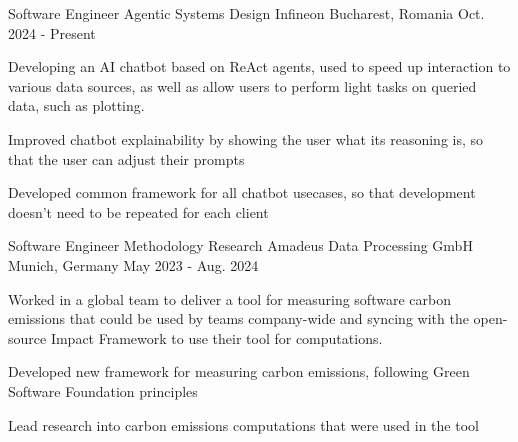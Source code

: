 

\begin{cventries}

  \cventry
    {Software Engineer \quad\textbar\quad Agentic Systems Design} %
    {Infineon} %
    {Bucharest, Romania} %
    {Oct. 2024 - Present} %
    {
      \begin{cvitems} %
        \item {Developing an AI chatbot based on ReAct agents, used to speed up interaction to various data sources, as well as allow users to perform light tasks on queried data, such as plotting.}
        \item {Improved chatbot explainability by showing the user what its reasoning is, so that the user can adjust their prompts}
        \item {Developed common framework for all chatbot usecases, so that development doesn’t need to be repeated for each client}
      \end{cvitems}
    }

  \cventry
    {Software Engineer \quad\textbar\quad Methodology Research} %
    {Amadeus Data Processing GmbH} %
    {Munich, Germany} %
    {May 2023 - Aug. 2024} %
    {
      \begin{cvitems} %
        \item {Worked in a global team to deliver a tool for measuring software carbon emissions that could be used by teams company-wide and syncing with the open-source Impact Framework to use their tool for computations.}
        \item {Developed new framework for measuring carbon emissions, following Green Software Foundation principles}
        \item {Lead research into carbon emissions computations that were used in the tool}
      \end{cvitems}
    }


\end{cventries}
